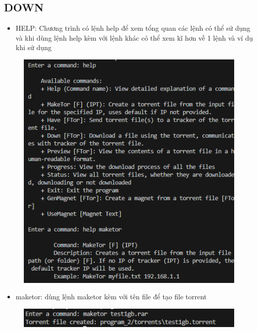 \documentclass[a4paper]{article}
\begin{document}
\subsection{DOWN}
\begin{itemize}
    \item HELP: Chương trình có lệnh help để xem tổng quan các lệnh có thể sử dụng và khi dùng lệnh help kèm với lệnh khác có thể xem kĩ hơn về 1 lệnh và ví dụ khi sử dụng
\end{itemize}
\begin{figure}[H]
    \centering
    \includegraphics[width=1\textwidth]{images/4.png}
    \captionsetup{labelformat=empty}
\end{figure}
\begin{itemize}
    \item maketor: dùng lệnh maketor kèm với tên file để tạo file torrent
\end{itemize}
\begin{figure}[H]
    \centering
    \includegraphics[width=1\textwidth]{images/5.png}
    \captionsetup{labelformat=empty}
\end{figure}
\end{document}
